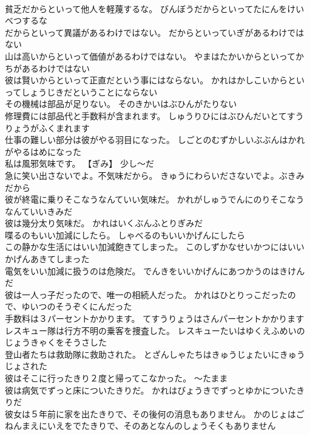 \documentclass[8pt]{extreport}
\begin{document}
\begin{CJK}{UTF8}{min}
\\	貧乏だからといって他人を軽蔑するな。	びんぼうだからといってたにんをけいべつするな 
\\	だからといって異議があるわけではない。	だからといっていぎがあるわけではない 
\\	山は高いからといって価値があるわけではない。	やまはたかいからといってかちがあるわけではない 
\\	彼は賢いからといって正直だという事にはならない。	かれはかしこいからといってしょうじきだということにならない 
\\	その機械は部品が足りない。	そのきかいはぶひんがたりない 
\\	修理費には部品代と手数料が含まれます。	しゅうりひにはぶひんだいとてすうりょうがふくまれます 
\\	仕事の難しい部分は彼がやる羽目になった。	しごとのむずかしいぶぶんはかれがやるはめになった 
\\	私は風邪気味です。	【ぎみ】 少し～だ
\\	急に笑い出さないでよ。不気味だから。	きゅうにわらいださないでよ。ぶきみだから 
\\	彼が終電に乗りそこなうなんていい気味だ。	かれがしゅうでんにのりそこなうなんていいきみだ 
\\	彼は幾分太り気味だ。	かれはいくぶんふとりぎみだ 
\\	喋るのもいい加減にしたら。	しゃべるのもいいかげんにしたら 
\\	この静かな生活にはいい加減飽きてしまった。	このしずかなせいかつにはいいかげんあきてしまった 
\\	電気をいい加減に扱うのは危険だ。	でんきをいいかげんにあつかうのはきけんだ 
\\	彼は一人っ子だったので、唯一の相続人だった。	かれはひとりっこだったので、ゆいつのそうぞくにんだった 
\\	手数料は３パーセントかかります。	てすうりょうはさんパーセントかかります 
\\	レスキュー隊は行方不明の乗客を捜査した。	レスキューたいはゆくえふめいのじょうきゃくをそうさした 
\\	登山者たちは救助隊に救助された。	とざんしゃたちはきゅうじょたいにきゅうじょされた 
\\	彼はそこに行ったきり２度と帰ってこなかった。	～たまま
\\	彼は病気でずっと床についたきりだ。	かれはびょうきでずっとゆかについたきりだ 
\\	彼女は５年前に家を出たきりで、その後何の消息もありません。	かのじょはごねんまえにいえをでたきりで、そのあとなんのしょうそくもありません 

\end{CJK}
\end{document}
